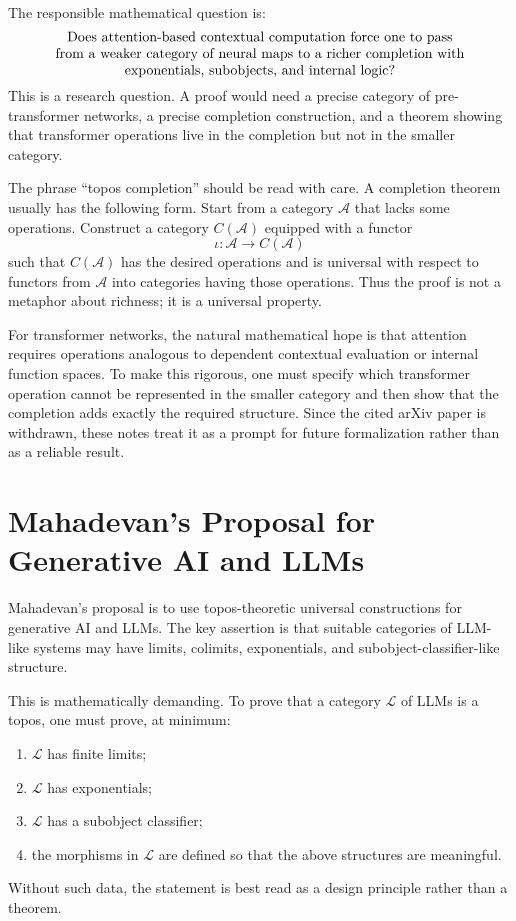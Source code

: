 \documentclass[11pt]{article}
\begin{document}
The responsible mathematical question is:
\[
\parbox{0.86\textwidth}{\centering
Does attention-based contextual computation force one to pass from a weaker
category of neural maps to a richer completion with exponentials, subobjects,
and internal logic?}
\]
This is a research question. A proof would need a precise category of
pre-transformer networks, a precise completion construction, and a theorem
showing that transformer operations live in the completion but not in the
smaller category.

The phrase ``topos completion'' should be read with care. A completion theorem
usually has the following form. Start from a category \(\mathcal A\) that lacks
some operations. Construct a category \(C(\mathcal A)\) equipped with a functor
\[
\iota:\mathcal A\to C(\mathcal A)
\]
such that \(C(\mathcal A)\) has the desired operations and is universal with
respect to functors from \(\mathcal A\) into categories having those operations.
Thus the proof is not a metaphor about richness; it is a universal property.

For transformer networks, the natural mathematical hope is that attention
requires operations analogous to dependent contextual evaluation or internal
function spaces. To make this rigorous, one must specify which transformer
operation cannot be represented in the smaller category and then show that the
completion adds exactly the required structure. Since the cited arXiv paper is
withdrawn, these notes treat it as a prompt for future formalization rather than
as a reliable result.

\section{Mahadevan's Proposal for Generative AI and LLMs}

Mahadevan's proposal is to use topos-theoretic universal constructions for
generative AI and LLMs. The key assertion is that suitable categories of LLM-like
systems may have limits, colimits, exponentials, and subobject-classifier-like
structure.

This is mathematically demanding. To prove that a category \(\mathcal L\) of
LLMs is a topos, one must prove, at minimum:
\begin{enumerate}
\item \(\mathcal L\) has finite limits;
\item \(\mathcal L\) has exponentials;
\item \(\mathcal L\) has a subobject classifier;
\item the morphisms in \(\mathcal L\) are defined so that the above structures
are meaningful.
\end{enumerate}
Without such data, the statement is best read as a design principle rather than
a theorem.
\end{document}
